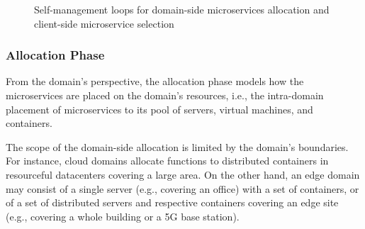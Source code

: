 \begin{figure}[thbp]
	\centering
	\captionsetup[subfigure]{width=0.4\textwidth}	
	\null\hfill
	\captionsetup[subfigure]{width=0.4\textwidth}	
	\hfill
	\hfill\null
	\caption{Self-management loops for domain-side microservices allocation and client-side microservice selection}\label{fig:allocation-loops}
\end{figure}

\subsubsection*{Allocation Phase}\label{sec:A3-E-allocation}

From the domain's perspective, the allocation phase models how the microservices are placed on the domain's resources, i.e., the intra-domain placement of microservices to its pool of servers, virtual machines, and containers. 

The scope of the domain-side allocation is limited by the domain's boundaries. For instance, cloud domains allocate functions to distributed containers in resourceful datacenters covering a large area. On the other hand, an edge domain may consist of a single server (e.g., covering an office) with a set of containers, or of a set of distributed servers and respective containers covering an edge site (e.g., covering a whole building or a 5G base station).

